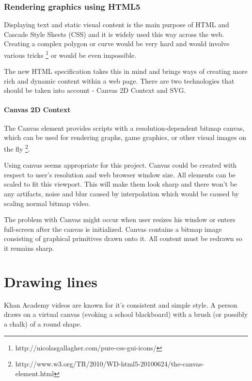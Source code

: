 \subsubsection{Rendering graphics using HTML5}

Displaying text and static visual content is the main purpose of HTML and Cascade Style Sheets (CSS) and it is widely used this way across the web. Creating a complex polygon or curve would be very hard and would involve various tricks \footnote{http://nicolasgallagher.com/pure-css-gui-icons/} or would be even impossible. 

The new HTML specification takes this in mind and brings ways of creating more rich and dynamic content within a web page. There are two technologies that should be taken into account - Canvas 2D Context and SVG.

\paragraph{Canvas 2D Context}
The Canvas element provides scripts with a resolution-dependent bitmap canvas, which can be used for rendering graphs, game graphics, or other visual images on the fly \cite{} \footnote{http://www.w3.org/TR/2010/WD-html5-20100624/the-canvas-element.html}. 

Using canvas seems appropriate for this project. Canvas could be created with respect to user's resolution and web browser window size. All elements can be scaled to fit this viewport. This will make them look sharp and there won't be any artifacts, noise and blur caused by interpolation which would be caused by scaling normal bitmap video.

The problem with Canvas might occur when user resizes his window or enters full-screen after the canvas is initialized. Canvas contains a bitmap image consisting of graphical primitives drawn onto it. All content must be redrawn so it remains sharp.











\section{Drawing lines}
Khan Academy videos are known for it's consistent and simple style. A person draws on a virtual canvas (evoking a school blackboard) with a brush (or possibly a chalk) of a round shape.

